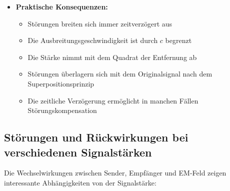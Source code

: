 \documentclass[12pt,a4paper]{article}
\begin{document}
\begin{itemize}
		\item \textbf{Praktische Konsequenzen:}
		\begin{itemize}
			\item Störungen breiten sich immer zeitverzögert aus
			\item Die Ausbreitungsgeschwindigkeit ist durch $c$ begrenzt
			\item Die Stärke nimmt mit dem Quadrat der Entfernung ab
			\item Störungen überlagern sich mit dem Originalsignal nach dem Superpositionsprinzip
			\item Die zeitliche Verzögerung ermöglicht in manchen Fällen Störungskompensation
		\end{itemize}
	\end{itemize}
	
	\subsection{Störungen und Rückwirkungen bei verschiedenen Signalstärken}
	Die Wechselwirkungen zwischen Sender, Empfänger und EM-Feld zeigen interessante Abhängigkeiten von der Signalstärke:
	
\end{document}
